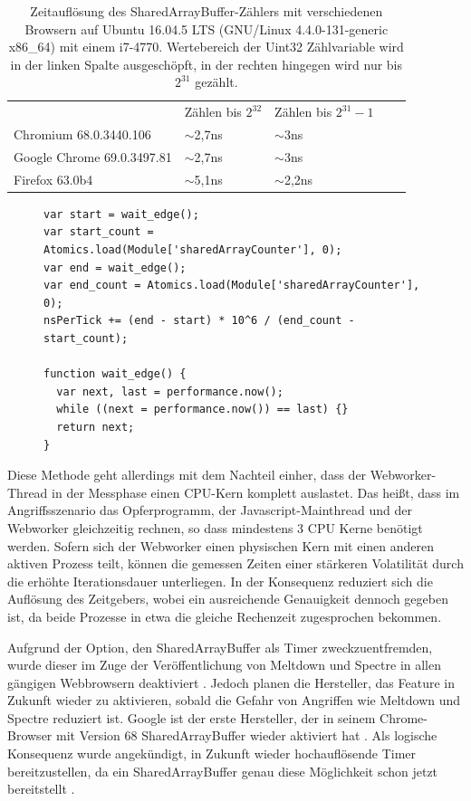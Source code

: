 \label{tbl:times_res}
\begin{table}[h]
\caption{Zeitauflösung des SharedArrayBuffer-Zählers mit verschiedenen Browsern auf Ubuntu 16.04.5 LTS (GNU/Linux 4.4.0-131-generic x86_64) mit einem i7-4770. Wertebereich der Uint32 Zählvariable wird in der linken Spalte ausgeschöpft, in der rechten hingegen wird nur bis $2^{31}$ gezählt.}
\begin{tabular}{lllll}
                           & Zählen bis $2^{32}$ & Zählen bis $2^{31}-1$ &  &  \\
Chromium 68.0.3440.106     & $\sim$2,7ns                      & $\sim$3ns                        &  &  \\
Google Chrome 69.0.3497.81 & $\sim$2,7ns                      & $\sim$3ns                        &  &  \\
Firefox 63.0b4             & $\sim$5,1ns                      & $\sim$2,2ns                      &  & 
\end{tabular}
\end{table}


\begin{figure}[h]
\label{alg_list:getResolutionNS}
\begin{lstlisting}[caption=main.js: Code welcher die Timerauflösung bestimmt]
var start = wait_edge();
var start_count = Atomics.load(Module['sharedArrayCounter'], 0);
var end = wait_edge();
var end_count = Atomics.load(Module['sharedArrayCounter'], 0);
nsPerTick += (end - start) * 10^6 / (end_count - start_count);

function wait_edge() {
  var next, last = performance.now();
  while ((next = performance.now()) == last) {}
  return next;
}
\end{lstlisting}
\end{figure}

Diese Methode geht allerdings mit dem Nachteil einher, dass der Webworker-Thread in der Messphase einen CPU-Kern komplett auslastet. Das heißt, dass im Angriffsszenario das Opferprogramm, der Javascript-Mainthread und der Webworker gleichzeitig rechnen, so dass mindestens 3 CPU Kerne benötigt werden. 
Sofern sich der Webworker einen physischen Kern mit einen anderen aktiven Prozess teilt, können die gemessen Zeiten einer stärkeren Volatilität durch die erhöhte Iterationsdauer unterliegen.
In der Konsequenz reduziert sich die Auflösung des Zeitgebers, wobei ein ausreichende Genauigkeit dennoch gegeben ist, da beide Prozesse in etwa die gleiche Rechenzeit zugesprochen bekommen.

Aufgrund der Option, den SharedArrayBuffer als Timer zweckzuentfremden, wurde dieser im Zuge der Veröffentlichung von Meltdown und Spectre in allen gängigen Webbrowsern deaktiviert \cite{FirefoxSharedArrayBuffer}. Jedoch planen die Hersteller, das Feature in Zukunft wieder zu aktivieren, sobald die Gefahr von Angriffen wie Meltdown und Spectre reduziert ist. 
Google ist der erste Hersteller, der in seinem Chrome-Browser mit Version 68 SharedArrayBuffer wieder aktiviert hat \cite{ChromeSharedArrayBufferAgain}. 
Als logische Konsequenz wurde angekündigt, in Zukunft wieder hochauflösende Timer bereitzustellen, da ein SharedArrayBuffer genau diese Möglichkeit schon jetzt bereitstellt \cite{ChromeHighResolutionTimerAgain}.

